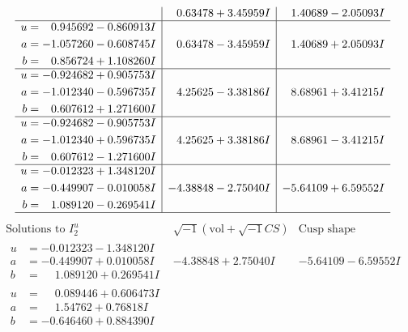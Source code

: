 \documentclass[1p]{elsarticle_modified}
\theoremstyle{definition}
\newcommand{\I}{\sqrt{-1}}
\begin{document}
$$\begin{array}{c|c|c}
 & \phantom{-}0.63478 + 3.45959 I & \phantom{-}1.40689 - 2.05093 I \\ \hline\begin{aligned}
u &= \phantom{-}0.945692 - 0.860913 I \\
a &= -1.057260 - 0.608745 I \\
b &= \phantom{-}0.856724 + 1.108260 I\end{aligned}
 & \phantom{-}0.63478 - 3.45959 I & \phantom{-}1.40689 + 2.05093 I \\ \hline\begin{aligned}
u &= -0.924682 + 0.905753 I \\
a &= -1.012340 - 0.596735 I \\
b &= \phantom{-}0.607612 + 1.271600 I\end{aligned}
 & \phantom{-}4.25625 - 3.38186 I & \phantom{-}8.68961 + 3.41215 I \\ \hline\begin{aligned}
u &= -0.924682 - 0.905753 I \\
a &= -1.012340 + 0.596735 I \\
b &= \phantom{-}0.607612 - 1.271600 I\end{aligned}
 & \phantom{-}4.25625 + 3.38186 I & \phantom{-}8.68961 - 3.41215 I \\ \hline\begin{aligned}
u &= -0.012323 + 1.348120 I \\
a &= -0.449907 - 0.010058 I \\
b &= \phantom{-}1.089120 - 0.269541 I\end{aligned}
 & -4.38848 - 2.75040 I & -5.64109 + 6.59552 I\\
 \hline 
 \end{array}$$\newpage$$\begin{array}{c|c|c}  
\text{Solutions to }I^u_{2}& \I (\text{vol} + \sqrt{-1}CS) & \text{Cusp shape}\\
 \hline 
\begin{aligned}
u &= -0.012323 - 1.348120 I \\
a &= -0.449907 + 0.010058 I \\
b &= \phantom{-}1.089120 + 0.269541 I\end{aligned}
 & -4.38848 + 2.75040 I & -5.64109 - 6.59552 I \\ \hline\begin{aligned}
u &= \phantom{-}0.089446 + 0.606473 I \\
a &= \phantom{-}1.54762 + 0.76818 I \\
b &= -0.646460 + 0.884390 I\end{aligned}

\end{array}$$
\end{document}
